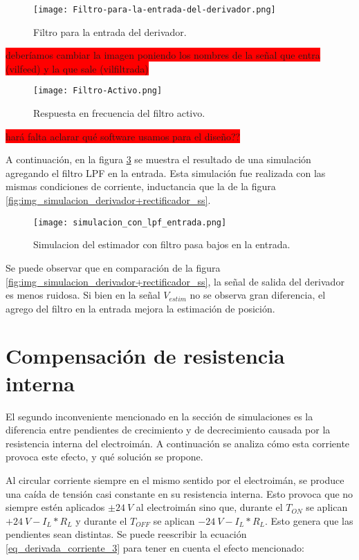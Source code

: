 \begin{figure}[H]
	\centering
	\texttt{[image: Filtro-para-la-entrada-del-derivador.png]}
	\caption{Filtro para la entrada del derivador.}
	\label{fig:img_Filtro-para-la-entrada-del-derivador}
\end{figure}

\colorbox{red}{deberíamos cambiar la imagen poniendo los nombres de la señal que entra (vilfeed) y la que sale (vilfiltrada)}
\begin{figure}[H]
	\centering
	\texttt{[image: Filtro-Activo.png]}
	\caption{Respuesta en frecuencia del filtro activo.}
	\label{fig:img_Respuesta-en-frecuencia-del-filtro-activo}
\end{figure}

\colorbox{red}{hará falta aclarar qué software usamos para el diseño??}

A continuación, en la figura \ref{fig:img_simulacion_lpf_entrada} se muestra el resultado de una simulación agregando el filtro LPF en la entrada. Esta simulación fue realizada con las mismas condiciones de corriente, inductancia que la de la figura \ref{fig:img_simulacion_derivador+rectificador_ss}.

\begin{figure}[H]
	\centering
	\texttt{[image: simulacion\_con\_lpf\_entrada.png]}
	\caption{Simulacion del estimador con filtro pasa 	bajos en la entrada.}
	\label{fig:img_simulacion_lpf_entrada}
\end{figure}

Se puede observar que en comparación de la figura \ref{fig:img_simulacion_derivador+rectificador_ss}, la señal de salida del derivador es menos ruidosa. Si bien en la señal $V_{estim}$ no se observa gran diferencia, el agrego del filtro en la entrada mejora la estimación de posición.

\section{Compensación de resistencia interna}

El segundo inconveniente mencionado en la sección de simulaciones es la diferencia entre pendientes de crecimiento y de decrecimiento causada por la resistencia interna del electroimán. A continuación se analiza cómo esta corriente provoca este efecto, y qué solución se propone.

Al circular corriente siempre en el mismo sentido por el electroimán, se produce una caída de tensión casi constante en su resistencia interna. Esto provoca que no siempre estén aplicados $\pm 24\:V$ al electroimán sino que, durante el $T_{ON}$ se aplican $+24\:V-I_L*R_L$ y durante el $T_{OFF}$ se aplican $-24\:V-I_L*R_L$. Esto genera que las pendientes sean distintas. Se puede reescribir la ecuación \ref{eq_derivada_corriente_3} para tener en cuenta el efecto mencionado:

